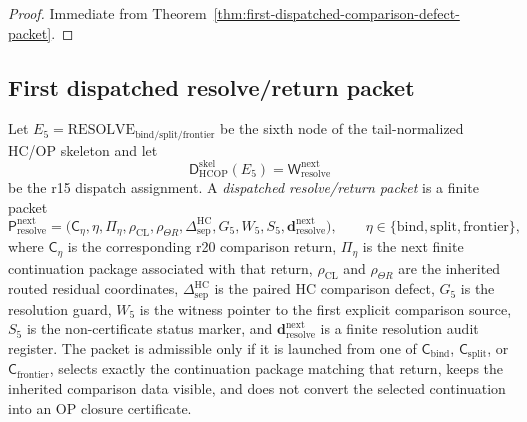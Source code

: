 \begin{proof}
Immediate from Theorem~\ref{thm:first-dispatched-comparison-defect-packet}.
\end{proof}

\subsection{First dispatched resolve/return packet}
\label{subsec:first-dispatched-resolve-return-packet}

\begin{definition}
\label{def:dispatched-resolve-return-packet}
Let \(E_5=\mathrm{RESOLVE}_{\mathrm{bind/split/frontier}}\) be the sixth node of the tail-normalized HC/OP skeleton and let
\[
  \mathsf D_{\mathrm{HCOP}}^{\mathrm{skel}}(E_5)
  =
  \mathsf W_{\mathrm{resolve}}^{\mathrm{next}}
\]
be the r15 dispatch assignment.  A \emph{dispatched resolve/return packet} is a finite packet
\[
  \mathsf P_{\mathrm{resolve}}^{\mathrm{next}}
  =
  \bigl(\mathsf C_{\eta},\eta,\Pi_{\eta},
        \rho_{\mathrm{CL}},\rho_{\Theta R},
        \Delta_{\mathrm{sep}}^{\mathrm{HC}},
        G_5,W_5,S_5,
        \mathbf d_{\mathrm{resolve}}^{\mathrm{next}}\bigr),
  \qquad
  \eta\in\{\mathrm{bind},\mathrm{split},\mathrm{frontier}\},
\]
where \(\mathsf C_{\eta}\) is the corresponding r20 comparison return, \(\Pi_{\eta}\) is the next finite continuation package associated with that return, \(\rho_{\mathrm{CL}}\) and \(\rho_{\Theta R}\) are the inherited routed residual coordinates, \(\Delta_{\mathrm{sep}}^{\mathrm{HC}}\) is the paired HC comparison defect, \(G_5\) is the resolution guard, \(W_5\) is the witness pointer to the first explicit comparison source, \(S_5\) is the non-certificate status marker, and \(\mathbf d_{\mathrm{resolve}}^{\mathrm{next}}\) is a finite resolution audit register.  The packet is admissible only if it is launched from one of \(\mathsf C_{\mathrm{bind}}\), \(\mathsf C_{\mathrm{split}}\), or \(\mathsf C_{\mathrm{frontier}}\), selects exactly the continuation package matching that return, keeps the inherited comparison data visible, and does not convert the selected continuation into an OP closure certificate.
\end{definition}

